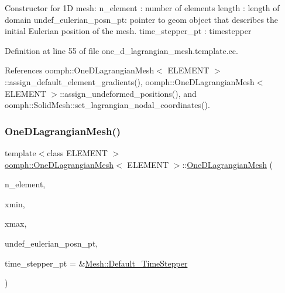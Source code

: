 Constructor for 1D mesh\+: n\+\_\+element \+: number of elements length \+: length of domain undef\+\_\+eulerian\+\_\+posn\+\_\+pt\+: pointer to geom object that describes the initial Eulerian position of the mesh. time\+\_\+stepper\+\_\+pt \+: timestepper 

Definition at line 55 of file one\+\_\+d\+\_\+lagrangian\+\_\+mesh.\+template.\+cc.



References oomph\+::\+One\+D\+Lagrangian\+Mesh$<$ E\+L\+E\+M\+E\+N\+T $>$\+::assign\+\_\+default\+\_\+element\+\_\+gradients(), oomph\+::\+One\+D\+Lagrangian\+Mesh$<$ E\+L\+E\+M\+E\+N\+T $>$\+::assign\+\_\+undeformed\+\_\+positions(), and oomph\+::\+Solid\+Mesh\+::set\+\_\+lagrangian\+\_\+nodal\+\_\+coordinates().

\mbox{\label{classoomph_1_1OneDLagrangianMesh_a20e1ab05b023f65bea5503938cd70385}} 
\subsubsection{\texorpdfstring{One\+D\+Lagrangian\+Mesh()}{OneDLagrangianMesh()}\hspace{0.1cm}{\footnotesize\ttfamily [2/2]}}
{\footnotesize\ttfamily template$<$class E\+L\+E\+M\+E\+NT $>$ \\
\hyperlink{classoomph_1_1OneDLagrangianMesh}{oomph\+::\+One\+D\+Lagrangian\+Mesh}$<$ E\+L\+E\+M\+E\+NT $>$\+::\hyperlink{classoomph_1_1OneDLagrangianMesh}{One\+D\+Lagrangian\+Mesh} (\begin{DoxyParamCaption}\item[{const unsigned \&}]{n\+\_\+element,  }\item[{const double \&}]{xmin,  }\item[{const double \&}]{xmax,  }\item[{\hyperlink{classoomph_1_1GeomObject}{Geom\+Object} $\ast$}]{undef\+\_\+eulerian\+\_\+posn\+\_\+pt,  }\item[{\hyperlink{classoomph_1_1TimeStepper}{Time\+Stepper} $\ast$}]{time\+\_\+stepper\+\_\+pt = {\ttfamily \&\hyperlink{classoomph_1_1Mesh_a12243d0fee2b1fcee729ee5a4777ea10}{Mesh\+::\+Default\+\_\+\+Time\+Stepper}} }\end{DoxyParamCaption})}



